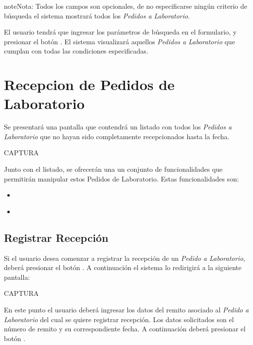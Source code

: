 \documentclass[a4paper,10pt,spanish]{sphinxmanual}
\begin{document}
\begin{notice}{note}{Nota:}
Todos los campos son opcionales, de no especificarse ningún criterio de búsqueda el sistema mostrará todos los \emph{Pedidos a Laboratorio}.
\end{notice}

El usuario tendrá que ingresar los parámetros de búsqueda en el formulario, y presionar el botón . El sistema visualizará aquellos \emph{Pedidos a Laboratorio} que cumplan con todas las condiciones especificadas.


\section{Recepcion de Pedidos de Laboratorio}
\label{receppedidosdelab::doc}\label{receppedidosdelab:recepcion-de-pedidos-de-laboratorio}
Se presentará una pantalla que contendrá un listado con todos los \emph{Pedidos a Laboratorio} que no hayan sido completamente recepcionados hasta la fecha.

CAPTURA

Junto con el listado, se ofrecerán una un conjunto de funcionalidades que permitirán manipular estos Pedidos de Laboratorio. Estas funcionalidades son:
\begin{itemize}
\item {} 
{\hyperref[receppedidosdelab:registrar\string-recepcion\string-rpl]{}}

\item {} 
{\hyperref[receppedidosdelab:formulario\string-busqueda\string-rpl]{}}

\end{itemize}


\subsection{Registrar Recepción}
\label{receppedidosdelab:registrar-recepcion-rpl}\label{receppedidosdelab:registrar-recepcion}
Si el usuario desea comenzar a registrar la recepción de un \emph{Pedido a Laboratorio}, deberá presionar el botón . A continuación el sistema lo redirigirá a la siguiente pantalla:

CAPTURA

En este punto el usuario deberá ingresar los datos del remito asociado al \emph{Pedido a Laboratorio} del cual se quiere registrar recepción. Los datos solicitados son el número de remito y su correspondiente fecha. A continuación deberá presionar el botón .
\end{document}
